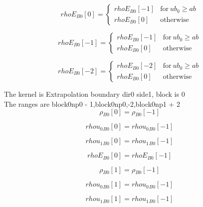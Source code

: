 \documentclass{article}
\begin{document}
\begin{dmath}{rhoE{_{B0}}}[{0}] = \begin{cases} {rhoE{_{B0}}}[{-1}] & \text{for}\: ub_{0} \geq ab \\{rhoE{_{B0}}}[{0}] & \text{otherwise} \end{cases}\end{dmath}

\begin{dmath}{rhoE{_{B0}}}[{-1}] = \begin{cases} {rhoE{_{B0}}}[{-1}] & \text{for}\: ub_{0} \geq ab \\{rhoE{_{B0}}}[{0}] & \text{otherwise} \end{cases}\end{dmath}

\begin{dmath}{rhoE{_{B0}}}[{-2}] = \begin{cases} {rhoE{_{B0}}}[{-2}] & \text{for}\: ub_{0} \geq ab \\{rhoE{_{B0}}}[{0}] & \text{otherwise} \end{cases}\end{dmath}

\noindent The kernel is Extrapolation boundary dir0 side1, block is 0\\\noindent The ranges are block0np0 - 1,block0np0,-2,block0np1 + 2\\\begin{dmath}{\rho{_{B0}}}[{0}] = {\rho{_{B0}}}[{-1}]\end{dmath}

\begin{dmath}{rhou_{0}{_{B0}}}[{0}] = {rhou_{0}{_{B0}}}[{-1}]\end{dmath}

\begin{dmath}{rhou_{1}{_{B0}}}[{0}] = {rhou_{1}{_{B0}}}[{-1}]\end{dmath}

\begin{dmath}{rhoE{_{B0}}}[{0}] = {rhoE{_{B0}}}[{-1}]\end{dmath}

\begin{dmath}{\rho{_{B0}}}[{1}] = {\rho{_{B0}}}[{-1}]\end{dmath}

\begin{dmath}{rhou_{0}{_{B0}}}[{1}] = {rhou_{0}{_{B0}}}[{-1}]\end{dmath}

\begin{dmath}{rhou_{1}{_{B0}}}[{1}] = {rhou_{1}{_{B0}}}[{-1}]\end{dmath}
\end{document}
